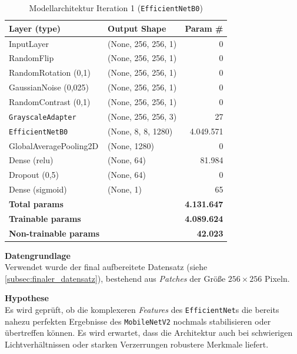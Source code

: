 \documentclass[
    a4paper,        %
    11pt,           %
    ngerman,        %
    parskip=half,   %
    listof=totoc,   %
    bibliography=totoc %
]{scrartcl}
\begin{document}
\begin{table}[H]
    \centering
    \caption{Modellarchitektur Iteration 1 (\texttt{EfficientNetB0})}
    \label{tab:effnetb0_model_summary_iter1}
    \begin{tabular}{llr}
        \toprule
        \textbf{Layer (type)} & \textbf{Output Shape} & \textbf{Param \#} \\
        \midrule
        InputLayer & (None, 256, 256, 1) & 0 \\
        RandomFlip & (None, 256, 256, 1) & 0 \\
        RandomRotation (0,1) & (None, 256, 256, 1) & 0 \\
        GaussianNoise (0,025) & (None, 256, 256, 1) & 0 \\
        RandomContrast (0,1) & (None, 256, 256, 1) & 0 \\
        \texttt{GrayscaleAdapter} & (None, 256, 256, 3) & 27 \\
        \texttt{EfficientNetB0} & (None, 8, 8, 1280) & 4.049.571 \\
        GlobalAveragePooling2D & (None, 1280) & 0 \\
        Dense (relu) & (None, 64) & 81.984 \\
        Dropout (0,5) & (None, 64) & 0 \\
        Dense (sigmoid) & (None, 1) & 65 \\
        \midrule
        \textbf{Total params} & & \textbf{4.131.647} \\
        \textbf{Trainable params} & & \textbf{4.089.624} \\
        \textbf{Non-trainable params} & & \textbf{42.023} \\
        \bottomrule
    \end{tabular}
\end{table}

\textbf{Datengrundlage} \\
Verwendet wurde der final aufbereitete Datensatz (siehe \autoref{subsec:finaler_datensatz}), bestehend aus \textit{Patches} der Größe $256 \times 256$ Pixeln.

\textbf{Hypothese} \\
Es wird geprüft, ob die komplexeren \textit{Features} des \texttt{EfficientNet}s die bereits nahezu perfekten Ergebnisse des \texttt{MobileNetV2} nochmals stabilisieren oder übertreffen können. Es wird erwartet, dass die Architektur auch bei schwierigen Lichtverhältnissen oder starken Verzerrungen robustere Merkmale liefert.
\end{document}
